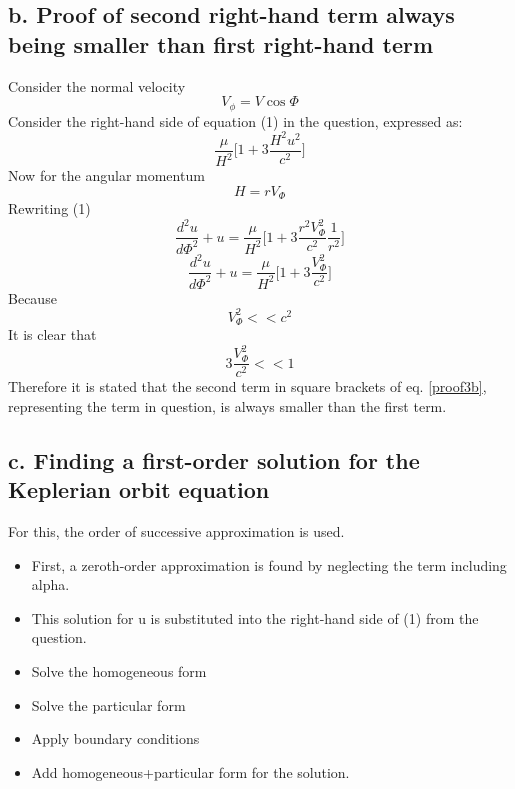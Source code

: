 \subsection{b. Proof of second right-hand term always being smaller than first right-hand term}
Consider the normal velocity
\begin{equation}
V_{\phi} = V \cos \Phi
\end{equation}
Consider the right-hand side of equation (1) in the question, expressed as:
\begin{equation}
\frac{\mu}{H^2} \Big[1 + 3\frac{H^2u^2}{c^2}\Big]
\end{equation}
Now for the angular momentum
\begin{equation}
H = r V_{\Phi}
\end{equation}
Rewriting (1)
\begin{equation}
\frac{d^2u}{d\Phi^2} + u = \frac{\mu}{H^2}\Big[1+3\frac{r^2V_{\Phi}^2}{c^2}\frac{1}{r^2}\Big]
\end{equation}
\begin{equation}
\frac{d^2u}{d\Phi^2} + u = \frac{\mu}{H^2}\Big[1+3\frac{V_{\Phi}^2}{c^2}\Big]
\label{proof3b}
\end{equation}
Because
\begin{equation}
V_{\Phi}^2 << c^2
\end{equation}
It is clear that
\begin{equation}
3 \frac{V_{\Phi}^2}{c^2} << 1
\end{equation}
Therefore it is stated that the second term in square brackets of eq. \ref{proof3b}, representing the term in question, is always smaller than the first term. 
\subsection{c. Finding a first-order solution for the Keplerian orbit equation}
For this, the order of successive approximation is used. 
\begin{itemize}
\item First, a zeroth-order approximation is found by neglecting the term including alpha.
\item This solution for u is substituted into the right-hand side of (1) from the question.
\item Solve the homogeneous form
\item Solve the particular form
\item Apply boundary conditions
\item Add homogeneous+particular form for the solution.
\end{itemize}
